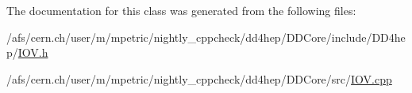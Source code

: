 The documentation for this class was generated from the following files\+:\begin{DoxyCompactItemize}
\item 
/afs/cern.\+ch/user/m/mpetric/nightly\+\_\+cppcheck/dd4hep/\+D\+D\+Core/include/\+D\+D4hep/\hyperlink{_i_o_v_8h}{I\+O\+V.\+h}\item 
/afs/cern.\+ch/user/m/mpetric/nightly\+\_\+cppcheck/dd4hep/\+D\+D\+Core/src/\hyperlink{_i_o_v_8cpp}{I\+O\+V.\+cpp}\end{DoxyCompactItemize}
